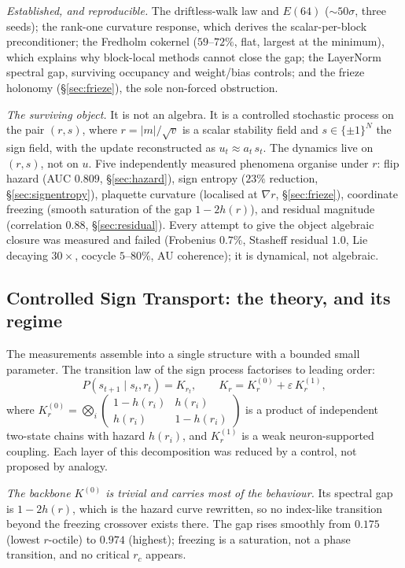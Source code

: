 \emph{Established, and reproducible.} The driftless-walk law and $E(64)$
($\sim\!50\sigma$, three seeds); the rank-one curvature response, which derives
the scalar-per-block preconditioner; the Fredholm cokernel ($59$--$72\%$, flat,
largest at the minimum), which explains why block-local methods cannot close the
gap; the LayerNorm spectral gap, surviving occupancy and weight/bias controls;
and the frieze holonomy (\S\ref{sec:frieze}), the sole non-forced obstruction.

\emph{The surviving object.} It is not an algebra. It is a controlled
stochastic process on the pair $(r,s)$, where $r=|m|/\sqrt v$ is a scalar
stability field and $s\in\{\pm1\}^N$ the sign field, with the update
reconstructed as $u_t\approx a_t\, s_t$. The dynamics live on $(r,s)$, not on
$u$. Five independently measured phenomena organise under $r$: flip hazard
(AUC $0.809$, \S\ref{sec:hazard}), sign entropy ($23\%$ reduction,
\S\ref{sec:signentropy}), plaquette curvature (localised at $\nabla r$,
\S\ref{sec:frieze}), coordinate freezing (smooth saturation of the gap
$1-2h(r)$), and residual magnitude (correlation $0.88$, \S\ref{sec:residual}).
Every attempt to give the object algebraic closure was measured and failed
(Frobenius $0.7\%$, Stasheff residual $1.0$, Lie decaying $30\times$, cocycle
$5$--$80\%$, AU coherence); it is dynamical, not algebraic.

\subsection{Controlled Sign Transport: the theory, and its regime}
\label{sec:cst}

The measurements assemble into a single structure with a bounded small
parameter. The transition law of the sign process factorises to leading order:
\[
  P(s_{t+1}\mid s_t, r_t) = K_{r_t}, \qquad
  K_r = K^{(0)}_r + \varepsilon\, K^{(1)}_r,
\]
where $K^{(0)}_r = \bigotimes_i \left(\begin{smallmatrix} 1-h(r_i) & h(r_i) \\ h(r_i) & 1-h(r_i)\end{smallmatrix}\right)$
is a product of independent two-state chains with hazard $h(r_i)$, and
$K^{(1)}_r$ is a weak neuron-supported coupling. Each layer of this
decomposition was reduced by a control, not proposed by analogy.

\emph{The backbone $K^{(0)}$ is trivial and carries most of the behaviour.} Its
spectral gap is $1-2h(r)$, which is the hazard curve rewritten, so no index-like
transition beyond the freezing crossover exists there. The gap rises smoothly
from $0.175$ (lowest $r$-octile) to $0.974$ (highest); freezing is a saturation,
not a phase transition, and no critical $r_c$ appears.

